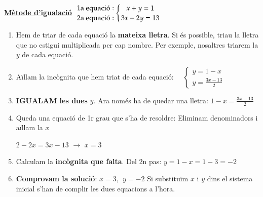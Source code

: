 \begin{example}[*]
		\textbf{\large \underline{Mètode d'igualació}}  \quad\quad\quad\quad
		$\genfrac{}{}{0pt}{0}{\text{  1a  equaci\'o}:}{\text{  2a  equaci\'o}:} \left\{\genfrac{}{}{0pt}{0}{x+y=1}{3x-2y=13}\right.$
		
		
			\begin{enumerate}
				\item  Hem de triar de cada equaci\'o la \textbf{mateixa lletra}. Si \'es possible, triau la lletra que  
				no estigui multiplicada per cap nombre.
		Per exemple, nosaltres triarem la $y$ de cada equaci\'o.  
				
				
				\item  A\"illam la incògnita que hem triat de cada equaci\'o: \ \  $\left\{ \begin{gathered}y=1-x\\y=\frac{3x-13}{2}\end{gathered} \right.$ 
				
				
				\item 	 \textbf{  IGUALAM les dues} $y$. Ara nom\'es ha de quedar una lletra: \quad $1-x=\frac{3x-13}{2}$
		
					\item  Queda una equaci\'o de 1r grau que s'ha de resoldre: Eliminam denominadors i a\"illam la $x$
			
		{\centering 
		$2-2x=3x-13$   $\rightarrow $  $x=3$
	 }
				
				\item 
					  Calculam la \textbf{inc\`ognita que falta}. Del 2n pas:  $y=1-x=1-3=-2$ 
			 
				
				\item
					\textbf{ Comprovam la soluci\'o}: $\boxed{x=3,\ \ y=-2}$  Si substitu\"im $x$ i $y$ dins el sistema inicial s'han de complir les dues equacions a l'hora.
				
			\end{enumerate}	
\end{example}

